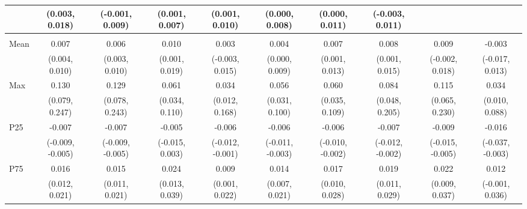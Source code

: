 {\begin{tabular}{l|c|c|c|c|c|c|c|c|c}
& {\scriptsize (0.003, 0.018)}
& {\scriptsize (-0.001, 0.009)}
& {\scriptsize (0.001, 0.007)}
& {\scriptsize (0.001, 0.010)}
& {\scriptsize (0.000, 0.008)}
& {\scriptsize (0.000, 0.011)}
& {\scriptsize (-0.003, 0.011)}
\\ [0.1cm]
\hline
\noalign{\smallskip}
\multicolumn{10}{l}{\textbf{Effect with Leads and Lags}} \\
\noalign{\smallskip}
\hline
Mean
& 0.007 & 0.006 & 0.010 & 0.003 & 0.004 & 0.007 & 0.008 & 0.009 & -0.003 \\
& {\scriptsize (0.004, 0.010)}
& {\scriptsize (0.003, 0.010)}
& {\scriptsize (0.001, 0.019)}
& {\scriptsize (-0.003, 0.015)}
& {\scriptsize (0.000, 0.009)}
& {\scriptsize (0.001, 0.013)}
& {\scriptsize (0.001, 0.015)}
& {\scriptsize (-0.002, 0.018)}
& {\scriptsize (-0.017, 0.013)}
\\ [0.1cm]
\hline
Max
& 0.130 & 0.129 & 0.061 & 0.034 & 0.056 & 0.060 & 0.084 & 0.115 & 0.034 \\
& {\scriptsize (0.079, 0.247)}
& {\scriptsize (0.078, 0.243)}
& {\scriptsize (0.034, 0.110)}
& {\scriptsize (0.012, 0.168)}
& {\scriptsize (0.031, 0.100)}
& {\scriptsize (0.035, 0.109)}
& {\scriptsize (0.048, 0.205)}
& {\scriptsize (0.065, 0.230)}
& {\scriptsize (0.010, 0.088)}
\\ [0.1cm]
\hline
P25
& -0.007 & -0.007 & -0.005 & -0.006 & -0.006 & -0.006 & -0.007 & -0.009 & -0.016 \\
& {\scriptsize (-0.009, -0.005)}
& {\scriptsize (-0.009, -0.005)}
& {\scriptsize (-0.015, 0.003)}
& {\scriptsize (-0.012, -0.001)}
& {\scriptsize (-0.011, -0.003)}
& {\scriptsize (-0.010, -0.002)}
& {\scriptsize (-0.012, -0.002)}
& {\scriptsize (-0.015, -0.005)}
& {\scriptsize (-0.037, -0.003)}
\\ [0.1cm]
\hline
P75
& 0.016 & 0.015 & 0.024 & 0.009 & 0.014 & 0.017 & 0.019 & 0.022 & 0.012 \\
& {\scriptsize (0.012, 0.021)}
& {\scriptsize (0.011, 0.021)}
& {\scriptsize (0.013, 0.039)}
& {\scriptsize (0.001, 0.022)}
& {\scriptsize (0.007, 0.021)}
& {\scriptsize (0.010, 0.028)}
& {\scriptsize (0.011, 0.029)}
& {\scriptsize (0.009, 0.037)}
& {\scriptsize (-0.001, 0.036)}
\\ [0.1cm]
\hline
\hline
\end{tabular}
}
